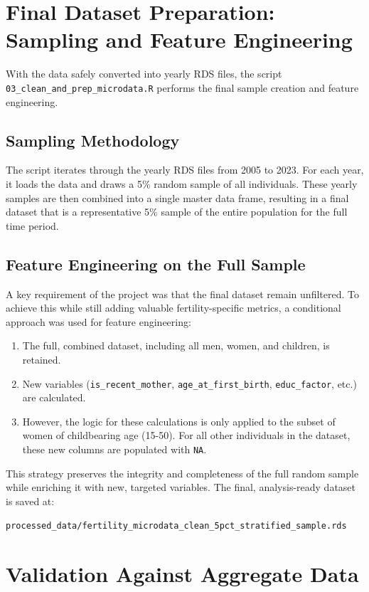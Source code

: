 \documentclass{article}
\begin{document}
\section{Final Dataset Preparation: Sampling and Feature Engineering}

With the data safely converted into yearly RDS files, the script \texttt{03\_clean\_and\_prep\_microdata.R} performs the final sample creation and feature engineering.

\subsection{Sampling Methodology}
The script iterates through the yearly RDS files from 2005 to 2023. For each year, it loads the data and draws a 5\% random sample of all individuals. These yearly samples are then combined into a single master data frame, resulting in a final dataset that is a representative 5\% sample of the entire population for the full time period.

\subsection{Feature Engineering on the Full Sample}
A key requirement of the project was that the final dataset remain unfiltered. To achieve this while still adding valuable fertility-specific metrics, a conditional approach was used for feature engineering:
\begin{enumerate}
    \item The full, combined dataset, including all men, women, and children, is retained.
    \item New variables (\texttt{is\_recent\_mother}, \texttt{age\_at\_first\_birth}, \texttt{educ\_factor}, etc.) are calculated.
    \item However, the logic for these calculations is only applied to the subset of women of childbearing age (15-50). For all other individuals in the dataset, these new columns are populated with \texttt{NA}.
\end{enumerate}
This strategy preserves the integrity and completeness of the full random sample while enriching it with new, targeted variables. The final, analysis-ready dataset is saved at:
\begin{center}
    \texttt{processed\_data/fertility\_microdata\_clean\_5pct\_stratified\_sample.rds}
\end{center}

\section{Validation Against Aggregate Data}
\end{document}
